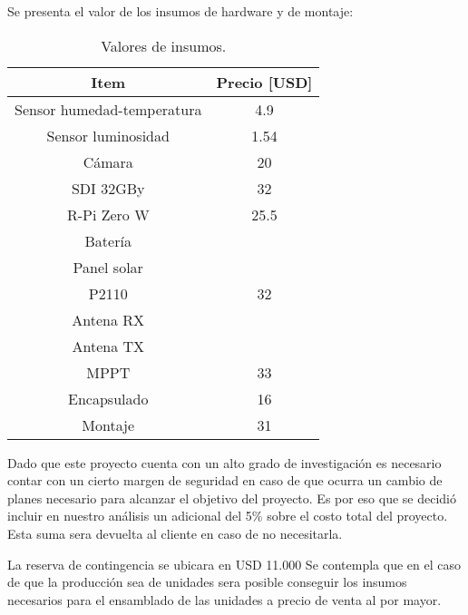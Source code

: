 Se presenta el valor de los insumos de hardware y de montaje:
\begin{table}[H]
\centering
\begin{tabular}{|c|c|}
\hline
\textbf{Item}                                                         & \textbf{Precio [USD]}				  \\ \hline
Sensor humedad-temperatura 											  & 4.9                                   \\ \hline
Sensor luminosidad                                                    & 1.54                                  \\ \hline
Cámara                                                                & 20                                    \\ \hline
SDI 32GBy                                                             & 32                                    \\ \hline
R-Pi Zero W                                                           & 25.5                                  \\ \hline
Batería                                                               & \TBD                   				  \\ \hline
Panel solar                                                           & \TBD                   				  \\ \hline
P2110                                                                 & 32                                    \\ \hline
Antena RX                                                             & \TBD                   				  \\ \hline
Antena TX                                                             & \TBD                   				  \\ \hline
MPPT                                                                  & 33                                    \\ \hline
Encapsulado                                                           & 16                                    \\ \hline
Montaje                                                               & 31                                    \\ \hline
\end{tabular}
\caption{Valores de insumos.}
\end{table}


Dado que este proyecto cuenta con un alto grado de investigación es necesario contar con un cierto margen de seguridad en caso de que ocurra un cambio de planes necesario para alcanzar el objetivo del proyecto. Es por eso que se decidió incluir en nuestro análisis un adicional del 5\% sobre el costo total del proyecto. Esta suma sera devuelta al cliente en caso de no necesitarla.

La reserva de contingencia se ubicara en  USD 11.000
Se contempla que en el caso de que la producción sea de \TBD unidades sera posible conseguir los insumos necesarios para el ensamblado de las unidades a precio de venta al por mayor. 

